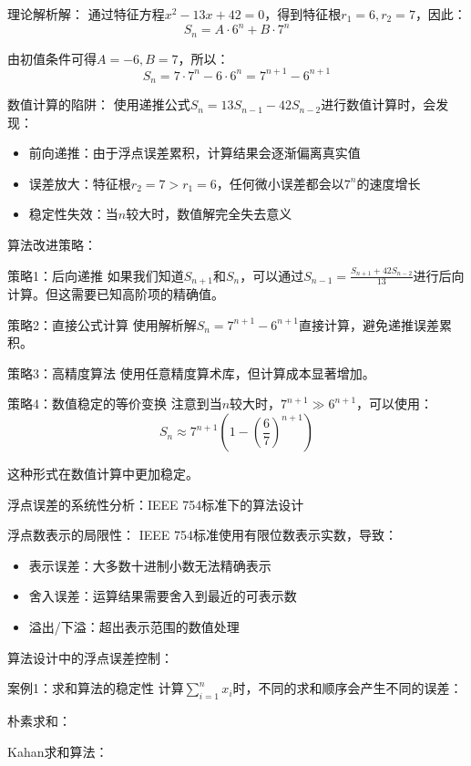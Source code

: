 理论解析解：
通过特征方程$x^2 - 13x + 42 = 0$，得到特征根$r_1 = 6, r_2 = 7$，因此：
$$S_n = A \cdot 6^n + B \cdot 7^n$$

由初值条件可得$A = -6, B = 7$，所以：
$$S_n = 7 \cdot 7^n - 6 \cdot 6^n = 7^{n+1} - 6^{n+1}$$

数值计算的陷阱：
使用递推公式$S_n = 13S_{n-1} - 42S_{n-2}$进行数值计算时，会发现：

\begin{itemize}
\item 前向递推：由于浮点误差累积，计算结果会逐渐偏离真实值
\item 误差放大：特征根$r_2 = 7 > r_1 = 6$，任何微小误差都会以$7^n$的速度增长
\item 稳定性失效：当$n$较大时，数值解完全失去意义
\end{itemize}

算法改进策略：

策略1：后向递推
如果我们知道$S_{n+1}$和$S_n$，可以通过$S_{n-1} = \frac{S_{n+1} + 42S_{n-2}}{13}$进行后向计算。但这需要已知高阶项的精确值。

策略2：直接公式计算
使用解析解$S_n = 7^{n+1} - 6^{n+1}$直接计算，避免递推误差累积。

策略3：高精度算法
使用任意精度算术库，但计算成本显著增加。

策略4：数值稳定的等价变换
注意到当$n$较大时，$7^{n+1} \gg 6^{n+1}$，可以使用：
$$S_n \approx 7^{n+1} \left(1 - \left(\frac{6}{7}\right)^{n+1}\right)$$

这种形式在数值计算中更加稳定。

浮点误差的系统性分析：IEEE 754标准下的算法设计

浮点数表示的局限性：
IEEE 754标准使用有限位数表示实数，导致：

\begin{itemize}
\item 表示误差：大多数十进制小数无法精确表示
\item 舍入误差：运算结果需要舍入到最近的可表示数
\item 溢出/下溢：超出表示范围的数值处理
\end{itemize}

算法设计中的浮点误差控制：

案例1：求和算法的稳定性
计算$\sum_{i=1}^n x_i$时，不同的求和顺序会产生不同的误差：

朴素求和：

Kahan求和算法：

